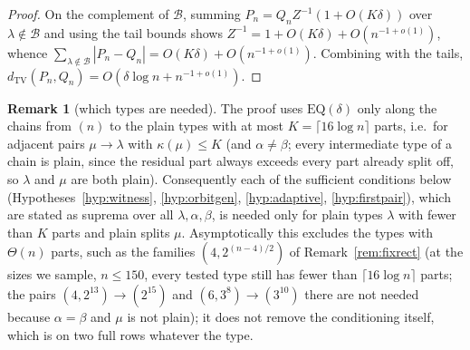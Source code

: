 \documentclass[11pt]{article}
\theoremstyle{definition}
\newtheorem{remark}[theorem]{Remark}
\newcommand{\dtv}{d_{\mathrm{TV}}}
\newcommand{\PP}{P}
\newcommand{\QQ}{Q}
\begin{document}
\begin{proof}
On the complement of $\mathcal B$, summing
$\PP_n=\QQ_n Z^{-1}(1+O(K\delta))$ over $\lambda\notin\mathcal B$ and using
the tail bounds shows $Z^{-1}=1+O(K\delta)+O(n^{-1+o(1)})$, whence
$\sum_{\lambda\notin\mathcal B}|\PP_n-\QQ_n|=O(K\delta)+O(n^{-1+o(1)})$.
Combining with the tails,
$\dtv(\PP_n,\QQ_n)=O(\delta\log n+n^{-1+o(1)})$.
\end{proof}

\begin{remark}[which types are needed]\label{rem:fewparts}
The proof uses $\mathrm{EQ}(\delta)$ only along the chains from $(n)$ to the plain types
with at most $K=\lceil16\log n\rceil$ parts, i.e.\ for adjacent pairs $\mu\to\lambda$ with
$\kappa(\mu)\le K$ (and $\alpha\ne\beta$; every intermediate type of a chain is plain,
since the residual part always exceeds every part already split off, so $\lambda$ and
$\mu$ are both plain).  Consequently each of the sufficient conditions below
(Hypotheses~\ref{hyp:witness}, \ref{hyp:orbitgen}, \ref{hyp:adaptive},
\ref{hyp:firstpair}), which are stated as suprema over all $\lambda,\alpha,\beta$, is
needed only for plain types $\lambda$ with fewer than $K$ parts and plain splits $\mu$.
Asymptotically this excludes the types with $\Theta(n)$ parts, such as the families
$(4,2^{(n-4)/2})$ of Remark~\ref{rem:fixrect} (at the sizes we sample, $n\le150$, every
tested type still has fewer than $\lceil16\log n\rceil$ parts; the pairs
$(4,2^{13})\to(2^{15})$ and $(6,3^8)\to(3^{10})$ there are not needed because $\alpha=\beta$
and $\mu$ is not plain); it does not remove the conditioning itself, which is on two full
rows whatever the type.
\end{remark}
\end{document}
